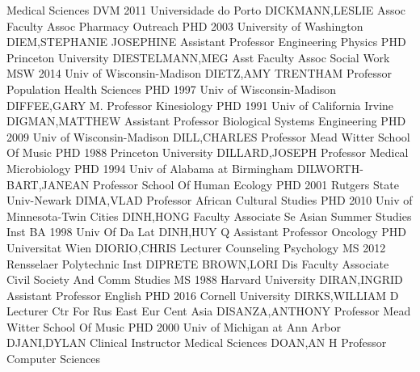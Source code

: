 \documentclass[
]{article}
\begin{document}
\textbar Medical Sciences \textbar DVM 2011 Universidade do Porto
\textbar{}  \textbar DICKMANN,LESLIE \textbar Assoc Faculty
Assoc \textbar Pharmacy Outreach \textbar PHD 2003 University of
Washington \textbar{}  \textbar DIEM,STEPHANIE JOSEPHINE
\textbar Assistant Professor \textbar Engineering Physics \textbar PHD
Princeton University \textbar{}  \textbar DIESTELMANN,MEG
\textbar Asst Faculty Assoc \textbar Social Work \textbar MSW 2014 Univ
of Wisconsin-Madison \textbar{}  \textbar DIETZ,AMY TRENTHAM
\textbar Professor \textbar Population Health Sciences \textbar PHD 1997
Univ of Wisconsin-Madison \textbar{}  \textbar DIFFEE,GARY M.
\textbar Professor \textbar Kinesiology \textbar PHD 1991 Univ of
California Irvine \textbar{}  \textbar DIGMAN,MATTHEW
\textbar Assistant Professor \textbar Biological Systems Engineering
\textbar PHD 2009 Univ of Wisconsin-Madison \textbar{} 
\textbar DILL,CHARLES \textbar Professor \textbar Mead Witter School Of
Music \textbar PHD 1988 Princeton University \textbar{} 
\textbar DILLARD,JOSEPH \textbar Professor \textbar Medical Microbiology
\textbar PHD 1994 Univ of Alabama at Birmingham \textbar{} 
\textbar DILWORTH-BART,JANEAN \textbar Professor \textbar School Of
Human Ecology \textbar PHD 2001 Rutgers State Univ-Newark \textbar{}
 \textbar DIMA,VLAD \textbar Professor \textbar African
Cultural Studies \textbar PHD 2010 Univ of Minnesota-Twin Cities
\textbar{}  \textbar DINH,HONG \textbar Faculty Associate
\textbar Se Asian Summer Studies Inst \textbar BA 1998 Univ Of Da Lat
\textbar{}  \textbar DINH,HUY Q \textbar Assistant Professor
\textbar Oncology \textbar PHD Universitat Wien \textbar{} 
\textbar DIORIO,CHRIS \textbar Lecturer \textbar Counseling Psychology
\textbar MS 2012 Rensselaer Polytechnic Inst \textbar{} 
\textbar DIPRETE BROWN,LORI \textbar Dis Faculty Associate
\textbar Civil Society And Comm Studies \textbar MS 1988 Harvard
University \textbar{}  \textbar DIRAN,INGRID
\textbar Assistant Professor \textbar English \textbar PHD 2016 Cornell
University \textbar{}  \textbar DIRKS,WILLIAM D
\textbar Lecturer \textbar Ctr For Rus East Eur Cent Asia
\textbar DISANZA,ANTHONY \textbar{}  \textbar Professor
\textbar Mead Witter School Of Music \textbar PHD 2000 Univ of Michigan
at Ann Arbor \textbar DJANI,DYLAN \textbar{} 
\textbar Clinical Instructor \textbar Medical Sciences \textbar DOAN,AN
H \textbar Professor \textbar{}  \textbar Computer Sciences
\end{document}
